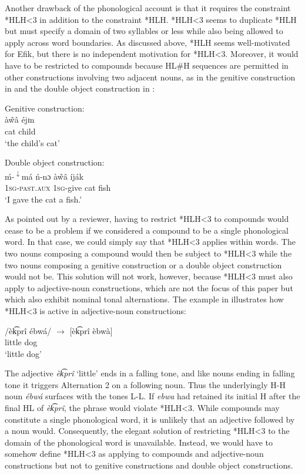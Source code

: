 \documentclass[output=paper]{langscibook}
\begin{document}
Another drawback of the phonological account is that it requires the constraint *HLH<3 in addition to the constraint *HLH. *HLH<3 seems to duplicate *HLH but must specify a domain of two syllables or less while also being allowed to apply across word boundaries. As discussed above, *HLH seems well-motivated for Efik, but there is no independent motivation for *HLH<3. Moreover, it would have to be restricted to compounds because HL\#H sequences are permitted in other constructions involving two adjacent nouns, as in the genitive construction in  and the double object construction in : 

\ea \label{ex:glewwe:6}
{Genitive construction:}\\
\gll \textup{à\~{w}â éjɪn}\\
     cat child\\
\glt ‘the child’s cat’  
\z

\ea\label{ex:glewwe:7} 
{Double object construction:}\\
\gll \textup{ḿ-}\textup{\textsuperscript{$\downarrow$}}\textup{má     ń-nɔ     à\~{w}â   íják} \\
     \textsc{\textup{1sg-past.aux}  \textsc{1sg-}}\textup{give    cat  fish}\\
\glt ‘I gave the cat a fish.’ 
\z

As pointed out by a reviewer, having to restrict *HLH<3 to compounds would cease to be a problem if we considered a compound to be a single phonological word. In that case, we could simply say that *HLH<3 applies within words. The two nouns composing a compound would then be subject to *HLH<3 while the two nouns composing a genitive construction or a double object construction would not be. This solution will not work, however, because *HLH<3 must also apply to adjective-noun constructions, which are not the focus of this paper but which also exhibit nominal tonal alternations.  The example in  illustrates how *HLH<3 is active in adjective-noun constructions:

\ea\label{ex:glewwe:8} 
\gll /èk͡prî  ébwá/  ${\rightarrow}$  [èk͡prî èbwà]\\ 
     little dog\\
\glt ‘little dog’
\z

The adjective \textit{èk͡prî} ‘little’ ends in a falling tone, and like nouns ending in falling tone it triggers Alternation 2 on a following noun. Thus the underlyingly H-H noun \textit{ébwá} surfaces with the tones L-L. If \textit{ebwa} had retained its initial H after the final HL of \textit{èk͡prî}, the phrase would violate *HLH<3. While compounds may constitute a single phonological word, it is unlikely that an adjective followed by a noun would. Consequently, the elegant solution of restricting *HLH<3 to the domain of the phonological word is unavailable. Instead, we would have to somehow define *HLH<3 as applying to compounds and adjective-noun constructions but not to genitive constructions and double object constructions.   
\end{document}
